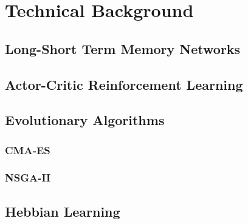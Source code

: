 \chapter{Technical Background}
\section{Long-Short Term Memory Networks}
\section{Actor-Critic Reinforcement Learning}

\section{Evolutionary Algorithms}
\subsection{CMA-ES}
\subsection{NSGA-II}

\section{Hebbian Learning}